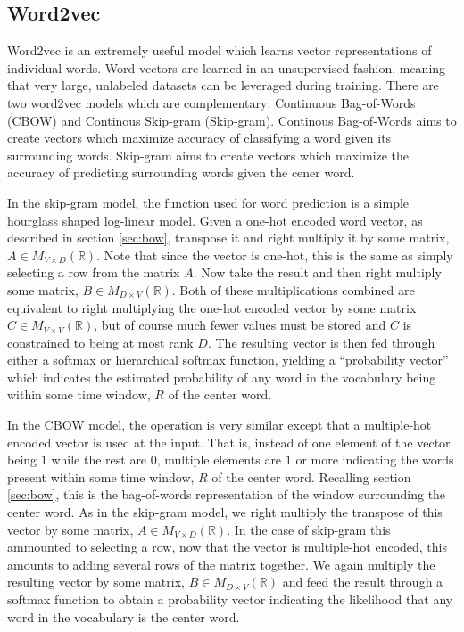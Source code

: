 \subsection{Word2vec}
Word2vec \cite{tm13_og} is an extremely useful model which learns vector representations of individual words.  Word vectors are learned in an unsupervised fashion, meaning that very large, unlabeled datasets can be leveraged during training.  There are two word2vec models which are complementary:  Continuous Bag-of-Words (CBOW) and Continous Skip-gram (Skip-gram).  Continous Bag-of-Words aims to create vectors which maximize accuracy of classifying a word given its surrounding words.  Skip-gram aims to create vectors which maximize the accuracy of predicting surrounding words given the cener word.

In the skip-gram model, the function used for word prediction is a simple hourglass shaped log-linear model.  Given a one-hot encoded word vector, as described in section \ref{sec:bow}, transpose it and right multiply it by some matrix, $A \in M_{V\times D}(\mathbb{R})$.  Note that since the vector is one-hot, this is the same as simply selecting a row from the matrix $A$.  Now take the result and then right multiply some matrix, $B \in M_{D\times V}(\mathbb{R})$.  Both of these multiplications combined are equivalent to right multiplying the one-hot encoded vector by some matrix $C \in M_{V\times V}(\mathbb{R})$, but of course much fewer values must be stored and $C$ is constrained to being at most rank $D$.  The resulting vector is then fed through either a softmax or hierarchical softmax function, yielding a ``probability vector'' which indicates the estimated probability of any word in the vocabulary being within some time window, $R$ of the center word.

In the CBOW model, the operation is very similar except that a multiple-hot encoded vector is used at the input.  That is, instead of one element of the vector being $1$ while the rest are $0$, multiple elements are $1$ or more indicating the words present within some time window, $R$ of the center word.  Recalling section \ref{sec:bow}, this is the bag-of-words representation of the window surrounding the center word.  As in the skip-gram model, we right multiply the transpose of this vector by some matrix, $A \in M_{V\times D}(\mathbb{R})$.  In the case of skip-gram this ammounted to selecting a row, now that the vector is multiple-hot encoded, this amounts to adding several rows of the matrix together.  We again multiply the resulting vector by some matrix, $B \in M_{D\times V}(\mathbb{R})$ and feed the result through a softmax function to obtain a probability vector indicating the likelihood that any word in the vocabulary is the center word.

